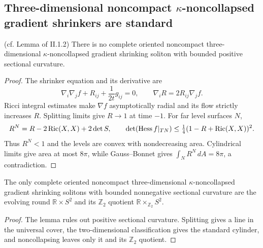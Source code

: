 \subsection{Three-dimensional noncompact $\kappa$-noncollapsed gradient shrinkers are standard}
\label{II.1.2}
\begin{lemma}
\label{lem:kl-three-dimensional-noncompact-noncollapsed-gradient-shrinkers-standard-existence-kappa-solutions}

\label{nosoliton} (cf. Lemma of II.1.2)
There is no complete oriented noncompact three-dimensional
$\kappa$-noncollapsed gradient shrinking soliton with bounded positive
sectional curvature.
\end{lemma}
\begin{proof}
\sketch The shrinker equation and its derivative are
\begin{equation}\label{IIeqn}
\nabla_i\nabla_jf+R_{ij}+\frac1{2t}g_{ij}=0,\qquad
\nabla_iR=2R_{ij}\nabla_jf.\label{gradR}
\end{equation}
Ricci integral estimates make $\nabla f$ asymptotically radial and its flow
strictly increases $R$.  Splitting limits give $R\to1$ at time $-1$.
For far level surfaces $N$,
\[
R^N=R-2\operatorname{Ric}(X,X)+2\det S,\qquad
\det(\operatorname{Hess} f|_{TN})\leq\tfrac14(1-R+\operatorname{Ric}(X,X))^2.
\]
Thus $R^N<1$ and the levels are convex with nondecreasing area.  Cylindrical
limits give area at most $8\pi$, while Gauss--Bonnet gives
$\int_NR^N\,dA=8\pi$, a contradiction.
\end{proof}
\begin{corollary}
\label{cor:kl-three-dimensional-noncompact-noncollapsed-gradient-shrinkers-standard-compactness-kappa-solutions}

\label{cornosoliton}
The only complete oriented noncompact three-dimensional $\kappa$-noncollapsed
gradient shrinking solitons with bounded nonnegative sectional curvature are
the evolving round $\mathbb R\times S^2$ and its
$\mathbb Z_2$ quotient $\mathbb R\times_{\mathbb Z_2}S^2$.
\end{corollary}
\begin{proof}
\sketch The lemma rules out positive sectional curvature.  Splitting gives a
line in the universal cover, the two-dimensional classification gives the
standard cylinder, and noncollapsing leaves only it and its $\mathbb Z_2$
quotient.
\end{proof}
